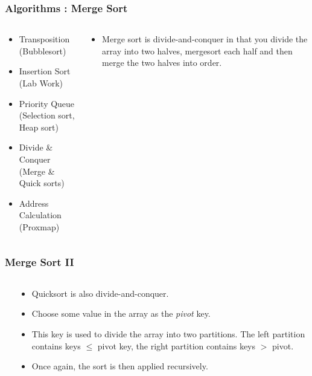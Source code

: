 \begin{frame}[fragile]
\frametitle{Algorithms : Merge Sort}
\begin{columns}[T]

\begin{column}{0.35\textwidth}
\begin{itemize}[<+->]
\item Transposition (Bubblesort)
\item Insertion Sort (Lab Work)
\item Priority Queue (Selection sort, Heap sort)
\item Divide \& Conquer (Merge \& Quick sorts)
\item Address Calculation (Proxmap)
\end{itemize}
\end{column}

\pause
\begin{column}{0.55\textwidth}
\begin{itemize}[<+->]
\item Merge sort is divide-and-conquer in that you
divide the array into two halves, mergesort each half and
then merge the two halves into order.
\end{itemize}
\pause

\end{column}

\end{columns}
\end{frame}


\begin{frame}[fragile]
\frametitle{Merge Sort II}
\begin{columns}[T]

\begin{column}{0.50\textwidth}

\end{column}

\pause
\begin{column}{0.40\textwidth}
\begin{itemize}[<+->]
\item Quicksort is also divide-and-conquer.
\item Choose some value in the array as the {\it pivot} key.
\item This key is used to divide the array into two partitions.
The left partition contains keys
$\leq$ pivot key, the right partition contains keys $>$ pivot.
\item Once again, the sort is then applied recursively.
\end{itemize}
\end{column}

\end{columns}
\end{frame}

